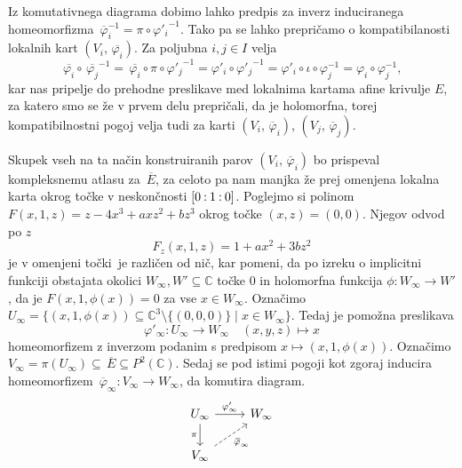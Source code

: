 \documentclass[mat1]{fmfdelo}
\newcommand{\C}{\mathbb C}
\newcommand{\PC}{P^2(\mathbb C)}
\newcommand{\inv}{^{-1}}
\newcommand{\pcoor}[1]{%
  \begingroup\lccode`~=`: \lowercase{\endgroup
  \edef~}{\mathbin{\mathchar\the\mathcode`:}\nobreak}%
  [%
  \begingroup
  \mathcode`:=\string"8000
  #1%
  \endgroup
  ]%
}
\newcommand{\olsi}[1]{\,\overline{\!{#1}}} %
\theoremstyle{definition}
\begin{document}
Iz komutativnega diagrama dobimo lahko predpis za inverz induciranega homeomorfizma $\olsi{\varphi}_i\inv = \pi \circ {\varphi'_i}\inv$. Tako pa se lahko prepričamo o kompatibilanosti lokalnih kart $(V_i, \olsi{\varphi_i})$. Za poljubna $i,j \in I$ velja
\[
    \olsi{\varphi_i} \circ \olsi{\varphi_j}\inv = 
    \olsi{\varphi_i} \circ \pi \circ {\varphi'_j}\inv = 
    \varphi'_i \circ {\varphi'_j}\inv = 
    \varphi'_i \circ \iota \circ \varphi_j\inv = 
    \varphi_i \circ \varphi_j\inv,
\]
kar nas pripelje do prehodne preslikave med lokalnima kartama afine krivulje $E$, za katero smo se že v prvem delu prepričali, da je holomorfna, torej kompatibilnostni pogoj velja tudi za karti $(V_i, \olsi{\varphi}_i)$, $(V_j, \olsi{\varphi}_j)$.

Skupek vseh na ta način konstruiranih parov $(V_i, \olsi{\varphi}_i)$ bo prispeval kompleksnemu atlasu za $\olsi{E}$, za celoto pa nam manjka že prej omenjena lokalna karta okrog točke v neskončnosti $\pcoor{0 : 1 : 0}$. Poglejmo si polinom $F(x, 1, z) = z - 4x^3 + axz^2 + bz^3$ okrog točke $(x,z) = (0,0)$. Njegov odvod po $z$ 
\[
    F_z(x,1,z) = 1 + ax^2 + 3bz^2
\]
je v omenjeni točki je različen od nič, kar pomeni, da po izreku o implicitni funkciji obstajata okolici $W_\infty, W' \subseteq \C$ točke $0$ in holomorfna funkcija $\phi : W_\infty \to W'$, da je $F(x, 1, \phi(x)) = 0$ za vse $x \in W_\infty$. Označimo $U_\infty = \{(x, 1, \phi(x)) \subseteq \C^3 \setminus \{(0,0,0)\}\mid x \in W_\infty\}$. Tedaj je pomožna preslikava 
\[
    \varphi'_\infty : U_\infty \to W_\infty \quad (x,y,z) \mapsto x
\]
homeomorfizem z inverzom podanim s predpisom $x \mapsto (x,1,\phi(x))$. Označimo $V_\infty = \pi(U_\infty) \subseteq \olsi{E} \subseteq \PC$. Sedaj se pod istimi pogoji kot zgoraj inducira homeomorfizem $\olsi{\varphi}_\infty : V_\infty \to W_\infty$, da komutira diagram.
\[    
    \begin{tikzcd}
        U_\infty \arrow{r}{\varphi'_\infty} \ar[labels=left]{d}{\pi} & W_\infty \\
        V_\infty \ar[dashed, labels=below right]{ur}{\olsi{\varphi}_\infty}
    \end{tikzcd}
\]
\end{document}
